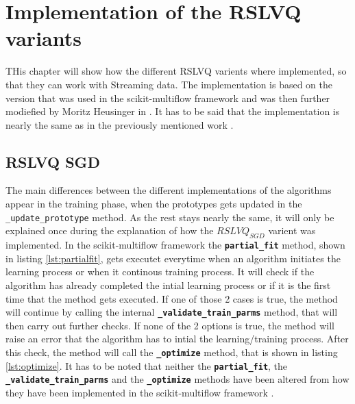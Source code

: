 \documentclass[12pt,oneside,a4paper,parskip]{scrbook}
\begin{document}
\section{Implementation of the RSLVQ variants}
THis chapter will show how the different RSLVQ varients where implemented, so that they can work with Streaming data.
The implementation is based on the version that was used in the scikit-multiflow framework \cite{skmultiflow} and was then further 
modiefied by Moritz Heusinger in \cite{PassiveDriftonRSLVQ}.
It has to be said that the implementation is nearly the same as in the previously mentioned work \cite{PassiveDriftonRSLVQ}.

\subsection{RSLVQ SGD}
The main differences between the different implementations of the algorithms appear in the training phase, when the prototypes
gets updated in the \texttt{\_update\_prototype} method. As the rest stays nearly the same, it will only be explained once during the explanation of how the $RSLVQ_\textit{SGD}$
varient was implemented.
In the scikit-multiflow framework the \textbf{\texttt{partial\_fit}} method, shown in listing \ref{lst:partialfit}, gets executet everytime when an algorithm initiates the
learning process or when it continous training process. It will check if the algorithm has already completed the intial 
learning process or if it is the first time that the method gets executed. If one of those 2 cases is true, the method will
continue by calling the internal \textbf{\texttt{\_validate\_train\_parms}} method, that will then carry out further checks.
If none of the 2 options is true, the method will raise an error that the algorithm has to intial the learning/training process.
After this check, the method will call the \textbf{\texttt{\_optimize}} method, that is shown in listing \ref{lst:optimize}.
It has to be noted that neither the \textbf{\texttt{partial\_fit}}, the \textbf{\texttt{\_validate\_train\_parms}} and the \textbf{\texttt{\_optimize}} methods
have been altered from how they have been implemented in the scikit-multiflow framework \cite{skmultiflow}.
\end{document}
